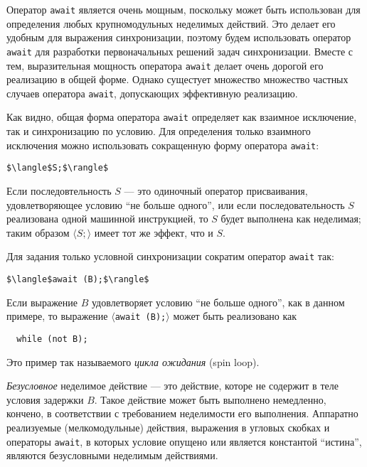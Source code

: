 Оператор \texttt{await} является очень мощным, поскольку может быть использован
для определения любых крупномодульных неделимых действий. Это делает его удобным
для выражения синхронизации, поэтому будем использовать оператор \texttt{await}
для разработки первоначальных решений задач синхронизации. Вместе с тем,
выразительная мощность оператора \texttt{await} делает очень дорогой его
реализацию в общей форме. Однако сущестует множество множество частных случаев
оператора \texttt{await}, допускающих эффективную реализацию.

Как видно, общая форма оператора \texttt{await} определяет как взаимное
исключение, так и синхронизацию по условию. Для определения только взаимного
исключения можно использовать сокращенную форму оператора \texttt{await}:

\begin{lstlisting}[mathescape]
  $\langle$S;$\rangle$
\end{lstlisting}

Если последовтельность $S$ --- это одиночный оператор присваивания,
удовлетворяющее условию ``не больше одного'', или если последовательность $S$
реализована одной машинной инструкцией, то $S$ будет выполнена как неделимая;
таким образом $\langle S;\rangle$ имеет тот же эффект, что и $S$.

Для задания только условной синхронизации сократим оператор \texttt{await} так:

\begin{lstlisting}[mathescape]
  $\langle$await (B);$\rangle$
\end{lstlisting}

Если выражение $B$ удовлетворяет условию ``не больше одного'', как в данном
примере, то выражение $\langle$\texttt{await (B);}$\rangle$ может быть
реализовано как

\begin{lstlisting}
  while (not B);
\end{lstlisting}

Это пример так называемого \emph{цикла ожидания} (spin loop).

\emph{Безусловное} неделимое действие --- это действие, которе не содержит в
теле условия задержки $B$. Такое действие может быть выполнено немедленно,
кончено, в соответствии с требованием неделимости его выполнения. Аппаратно
реализуемые (мелкомодульные) действия, выражения в угловых скобках и операторы
\texttt{await}, в которых условие опущено или является константой ``истина'',
являются безусловными неделимым действиями.

